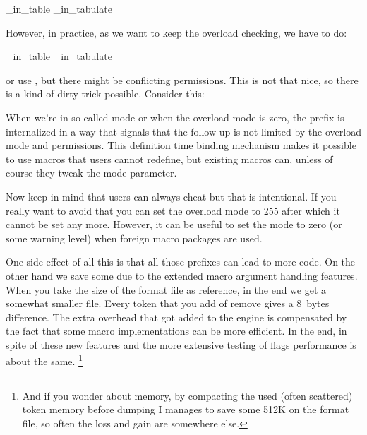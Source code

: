 \starttyping[option=TEX]
\frozen\protected{}
\frozen\protected{}
\overloaded\let\NC\NC_in_table
\overloaded\let\NC\NC_in_tabulate
\stoptyping

However, in practice, as we want to keep the overload checking, we have to do:

\starttyping[option=TEX]
\frozen\protected{}
\frozen\protected{}
\overloaded\frozen\let\NC\NC_in_table
\overloaded\frozen\let\NC\NC_in_tabulate
\stoptyping

or use \type {\aliased}, but there might be conflicting permissions. This is not
that nice, so there is a kind of dirty trick possible. Consider this:

\starttyping[option=TEX]
\frozen\protected{}
\frozen\protected{}
\def\setNCintable   {\enforced\let\frozen\let\NC\NC_in_table}
\def\setNCintabulate{\enforced\let\frozen\let\NC\NC_in_tabulate}
\stoptyping

When we're in so called  mode or when the overload mode is zero,
the \type {\enforced} prefix is internalized in a way that signals that the
follow up is not limited by the overload mode and permissions. This definition
time binding mechanism makes it possible to use  macros that
users cannot redefine, but existing macros can, unless of course they tweak the
mode parameter.

Now keep in mind that users can always cheat but that is intentional. If you
really want to avoid that you can set the overload mode to 255 after which it
cannot be set any more. However, it can be useful to set the mode to zero (or
some warning level) when foreign macro packages are used.

\stopsectionlevel

\startsectionlevel[title=Complications]

One side effect of all this is that all those prefixes can lead to more code. On
the other hand we save some due to the extended macro argument handling features.
When you take the size of the format file as reference, in the end we get a
somewhat smaller file. Every token that you add of remove gives a 8~bytes
difference. The extra overhead that got added to the engine is compensated by the
fact that some macro implementations can be more efficient. In the end, in spite
of these new features and the more extensive testing of flags performance is
about the same. \footnote {And if you wonder about memory, by compacting the used
(often scattered) token memory before dumping I manages to save some 512K on the
format file, so often the loss and gain are somewhere else.}

